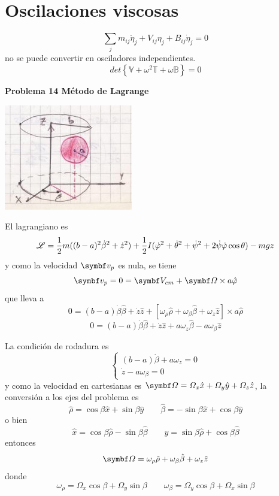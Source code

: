 \documentclass[10pt,oneside]{CBFT_book}
\begin{document}
\section{Oscilaciones viscosas}

\[
	\sum_j m_{ij} \ddot{\eta}_j + V_{ij}\eta_j + B_{ij}\dot{\eta}_j = 0
\]
no se puede convertir en osciladores independientes.
\[
	det\left\{ \mathbb{V} + \omega^2 \mathbb{T} + \omega \mathbb{B}\right\} = 0
\]


\begin{ejemplo}{\bf Problema 14 Método de Lagrange}

\includegraphics[scale=0.5]{images/fig_mc_lagrangebola_1.jpg}

El lagrangiano es
\[
	\mathscr{L} = \frac 1 2 m ( (b-a)^2 \dot{\beta}^2 + \dot{z}^2 ) + 
	\frac 1 2 I ( \dot{\varphi}^2 + \dot{\theta}^2 + \dot{\psi}^2 + 2 \dot{\psi} \dot{\varphi} \cos\theta ) 
	- m g z
\]
y como la velocidad $ \vb{v}_p $ es nula, se tiene 
\[
	\vb{v}_p = 0 = \vb{V}_{cm} + \vb{\Omega} \times a \hat{\vp}
\]
que lleva a
\[
	0 = (b-a)\dot{\beta}\hat{\beta} + \dot{z}\hat{z} +
	[\omega_\rho\hat{\rho} + \omega_\beta\hat{\beta} + \omega_z\hat{z} ]\times a\hat{\rho}
\]
\[
	0 = (b-a)\dot{\beta}\hat{\beta} + \dot{z}\hat{z} + a\omega_z\hat{\beta} - a\omega_\beta\hat{z} 
\]

La condición de rodadura es
\[
	\begin{cases}
	 (b-a)\dot{\beta} + a \omega_z = 0 \\
	 \dot{z} - a \omega_\beta = 0
	\end{cases}
\]
y como la velocidad en cartesianas es $ \vb{\Omega} = \Omega_x \hat{x} + \Omega_y \hat{y} + \Omega_z \hat{z} $,
la conversión a los ejes del problema es
\[
	\hat{\rho} = \cos \beta \hat{x} + \sin \beta \hat{y} \qquad 
	\hat{\beta} = -\sin \beta \hat{x} + \cos \beta \hat{y}
\]
o bien
\[
	\hat{x} = \cos \beta \hat{\rho} - \sin \beta \hat{\beta} \qquad 
	\hat{y} = \sin \beta \hat{\rho} + \cos \beta \hat{\beta}
\]
entonces
\[
	\vb{\Omega} = \omega_\rho \hat{\rho} + \omega_\beta \hat{\beta} + \omega_z \hat{z}
\]
donde 
\[
	\omega_\rho = \Omega_x \cos\beta + \Omega_y \sin\beta \qquad 
	\omega_\beta = \Omega_y \cos\beta + \Omega_x \sin\beta 
\]


\end{ejemplo}
\end{document}
